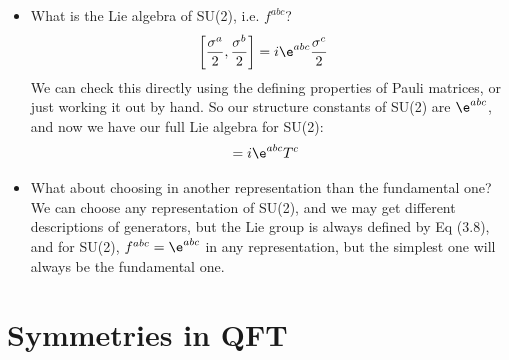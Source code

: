 \documentclass[a4paper, 11pt, normalem]{report}
\begin{document}
\begin{itemize}
    \item What is the Lie algebra of SU(2), i.e. $f^{abc}$?
        \begin{align}
            \left[\frac{\sigma^a}{2},\frac{\sigma^b}{2}\right] &= i\e^{abc}\frac{\sigma^c}{2}
        \end{align}
        We can check this directly using the defining properties of Pauli matrices, or just working it out by hand.
        So our structure constants of SU(2) are $\e^{abc}$, and now we have our full Lie algebra for SU(2):
        \begin{align}
            [T^a,T^b] &= i\e^{abc}T^c
        \end{align}
    \item What about choosing in another representation than the fundamental one?\\
        We can choose any representation of SU(2), and we may get different descriptions of generators, but the Lie group is always defined by Eq (3.8), and for SU(2), $f^{abc} = \e^{abc}$ in any representation, but the simplest one will always be the fundamental one.
\end{itemize}

\chapter{Symmetries in QFT}
\end{document}
